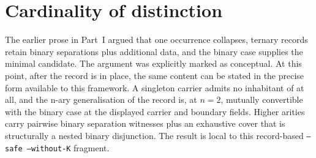 \documentclass[11pt]{article}
\begin{document}
\section{Cardinality of distinction}

The earlier prose in Part~I argued that one occurrence collapses,
ternary records retain binary separations plus additional data, and the
binary case supplies the minimal candidate.  The argument was explicitly
marked as conceptual.  At this point, after the
 record is in place, the same content can be
stated in the precise form available to this framework.  A singleton
carrier admits no inhabitant of  at all, and
the n-ary generalisation of the record is, at $n=2$, mutually
convertible with the binary case at the displayed carrier and boundary
fields.  Higher arities carry pairwise binary separation witnesses plus
an exhaustive cover that is structurally a nested binary disjunction.
The result is local to this record-based \texttt{--safe --without-K}
fragment.
\end{document}
